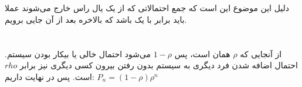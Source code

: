 \documentclass[]{article}
\begin{document}
\section{}
دلیل این موضوع این است که جمع احتمالاتی که از یک یال راس خارج می‌شوند عملا باید برابر با یک باشد
که بالاخره بعد از آن
جایی برویم.

\section{}

\section{}
از آنجایی که
$\rho$ همان 
است، پس
$1 - \rho$
می‌شود احتمال خالی یا بیکار بودن سیستم. احتمال اضافه شدن فرد دیگری به سیستم بدون رفتن بیرون کسی دیگری
نیز برابر
$rho$
است. پس در نهایت داریم:
$P_n = (1 - \rho) \rho^n$
\end{document}
